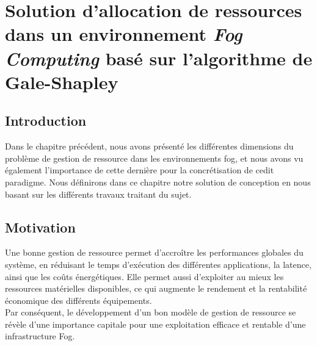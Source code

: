 \chapter{Solution d'allocation de ressources dans un environnement \emph{Fog Computing} basé sur l'algorithme de Gale-Shapley}
\section{Introduction}
Dans le chapitre précédent, nous avons présenté les différentes dimensions du problème de gestion de ressource dans les environnements fog, et nous avons vu également l’importance de cette dernière pour la concrétisation de cedit paradigme.
Nous définirons dans ce chapitre notre solution de conception en nous basant sur les différents travaux traitant du sujet.
\section{Motivation}
Une bonne gestion de ressource permet d'accroître les performances globales du système, en réduisant le temps d'exécution des différentes applications, la latence, ainsi que les coûts énergétiques. Elle permet aussi d’exploiter au mieux les ressources matérielles disponibles, ce qui augmente le rendement et la rentabilité économique des différents équipements.\\ 
Par conséquent, le développement d’un bon modèle de gestion de ressource se révèle d’une importance capitale pour une exploitation efficace et rentable d’une infrastructure Fog.
